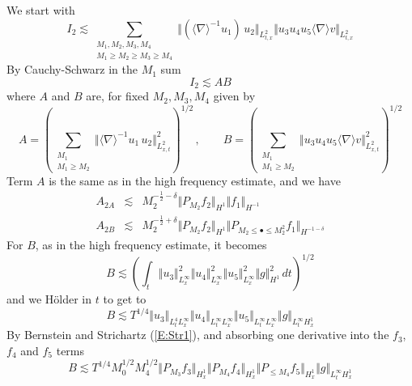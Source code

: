\documentclass[12pt,letterpaper,leqno]{amsart}
\theoremstyle{plain}
\numberwithin{equation}{section}
\numberwithin{theorem}{section}
\numberwithin{proposition}{section}
\numberwithin{lemma}{section}
\numberwithin{corollary}{section}
\begin{document}
We start with 
\begin{equation*}
I_{2}\lesssim \sum_{\substack{ M_{1},M_{2},M_{3},M_{4}  \\ M_{1}\geq
M_{2}\geq M_{3}\geq M_{4}}}\Vert (\langle \nabla \rangle
^{-1}u_{1})\,u_{2}\Vert _{L_{t,x}^{2}}\Vert u_{3}u_{4}u_{5}\langle \nabla
\rangle v\Vert _{L_{t,x}^{2}}
\end{equation*}%
By Cauchy-Schwarz in the $M_{1}$ sum 
\begin{equation*}
I_{2}\lesssim AB
\end{equation*}%
where $A$ and $B$ are, for fixed $M_{2},M_{3},M_{4}$ given by 
\begin{equation*}
A=\left( \sum_{\substack{ M_{1}  \\ M_{1}\geq M_{2}}}\Vert \langle \nabla
\rangle ^{-1}u_{1}\,u_{2}\Vert _{L_{x,t}^{2}}^{2}\right) ^{1/2}\,,\qquad
B=\left( \sum_{\substack{ M_{1}  \\ M_{1}\geq M_{2}}}\Vert
u_{3}u_{4}u_{5}\langle \nabla \rangle v\Vert _{L_{x,t}^{2}}^{2}\right) ^{1/2}
\end{equation*}%
Term $A$ is the same as in the high frequency estimate, and we have 
\begin{eqnarray*}
A_{2A} &\lesssim &M_{2}^{-\frac{1}{2}-\delta }\Vert P_{M_{2}}f_{2}\Vert
_{H^{1}}\Vert f_{1}\Vert _{H^{-1}} \\
A_{2B} &\lesssim &M_{2}^{-\frac{1}{2}+\delta }\Vert P_{M_{2}}f_{2}\Vert
_{H^{1}}\Vert P_{M_{2}\leq \bullet \leq M_{2}^{2}}f_{1}\Vert _{H^{-1-\delta
}}
\end{eqnarray*}%
For $B$, as in the high frequency estimate, it becomes 
\begin{equation*}
B\lesssim \left( \int_{t}\Vert u_{3}\Vert _{L_{x}^{\infty }}^{2}\Vert
u_{4}\Vert _{L_{x}^{\infty }}^{2}\Vert u_{5}\Vert _{L_{x}^{\infty
}}^{2}\Vert g\Vert _{H^{1}}^{2}\,dt\right) ^{1/2}
\end{equation*}%
and we H\"{o}lder in $t$ to get to 
\begin{equation*}
B\lesssim T^{1/4}\Vert u_{3}\Vert _{L_{t}^{4}L_{x}^{\infty }}\Vert
u_{4}\Vert _{L_{t}^{\infty }L_{x}^{\infty }}\Vert u_{5}\Vert _{L_{t}^{\infty
}L_{x}^{\infty }}\Vert g\Vert _{L_{t}^{\infty }H_{x}^{1}}
\end{equation*}%
By Bernstein and Strichartz (\ref{E:Str1}), and absorbing one derivative
into the $f_{3}$, $f_{4}$ and $f_{5}$ terms 
\begin{equation*}
B\lesssim T^{1/4}M_{0}^{1/2}M_{4}^{1/2}\Vert P_{M_{3}}f_{3}\Vert
_{H_{x}^{1}}\Vert P_{M_{4}}f_{4}\Vert _{H_{x}^{1}}\Vert P_{\leq
M_{4}}f_{5}\Vert _{H_{x}^{1}}\Vert g\Vert _{L_{t}^{\infty }H_{x}^{1}}
\end{equation*}%
\end{document}
